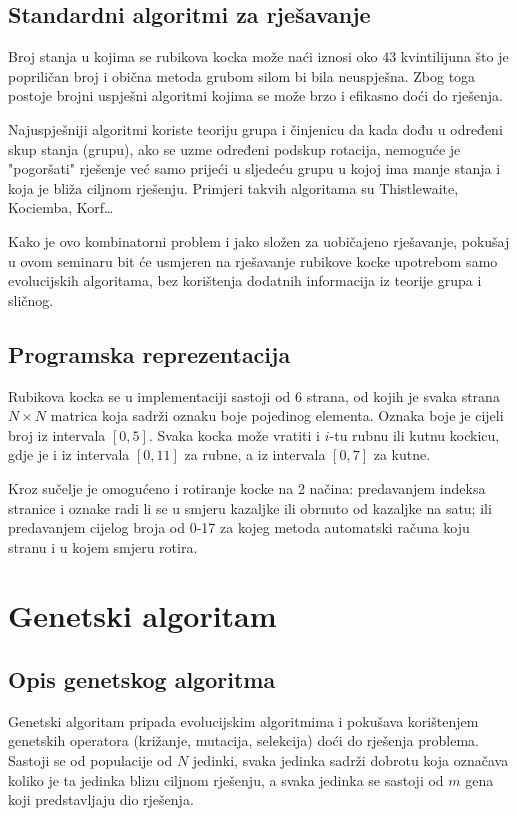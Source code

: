 \documentclass[times, utf8, seminar, numeric]{fer}
\begin{document}
\section{Standardni algoritmi za rješavanje}

Broj stanja u kojima se rubikova kocka može naći iznosi oko 43 kvintilijuna što je popriličan broj i obična metoda grubom silom bi bila neuspješna. Zbog toga postoje brojni uspješni algoritmi kojima se može brzo i efikasno doći do rješenja.

Najuspješniji algoritmi koriste teoriju grupa i činjenicu da kada dođu u određeni skup stanja (grupu), ako se uzme određeni podskup rotacija, nemoguće je "pogoršati" rješenje već samo prijeći u sljedeću grupu u kojoj ima manje stanja i koja je bliža ciljnom rješenju. Primjeri takvih algoritama su Thistlewaite, Kociemba, Korf\dots \cite{rubik:algos}

Kako je ovo kombinatorni problem i jako složen za uobičajeno rješavanje, pokušaj u ovom seminaru bit će usmjeren na rješavanje rubikove kocke upotrebom samo evolucijskih algoritama, bez korištenja dodatnih informacija iz teorije grupa i sličnog.

\section{Programska reprezentacija}
Rubikova kocka se u implementaciji sastoji od 6 strana, od kojih je svaka strana $N\times N$ matrica koja sadrži oznaku boje pojedinog elementa. Oznaka boje je cijeli broj iz intervala $[0, 5]$. Svaka kocka može vratiti i $i$-tu rubnu ili kutnu kockicu, gdje je i iz intervala $[0, 11]$ za rubne, a iz intervala $[0, 7]$ za kutne. 

Kroz sučelje je omogućeno i rotiranje kocke na 2 načina: predavanjem indeksa stranice i oznake radi li se u smjeru kazaljke ili obrnuto od kazaljke na satu; ili predavanjem cijelog broja od 0-17 za kojeg metoda automatski računa koju stranu i u kojem smjeru rotira.

\chapter{Genetski algoritam}

\section{Opis genetskog algoritma}
Genetski algoritam pripada evolucijskim algoritmima i pokušava korištenjem genetskih operatora (križanje, mutacija, selekcija) doći do rješenja problema. Sastoji se od populacije od $N$ jedinki, svaka jedinka sadrži dobrotu  koja označava koliko je ta jedinka blizu ciljnom rješenju, a svaka jedinka se sastoji od $m$ gena koji predstavljaju dio rješenja. 
\end{document}
